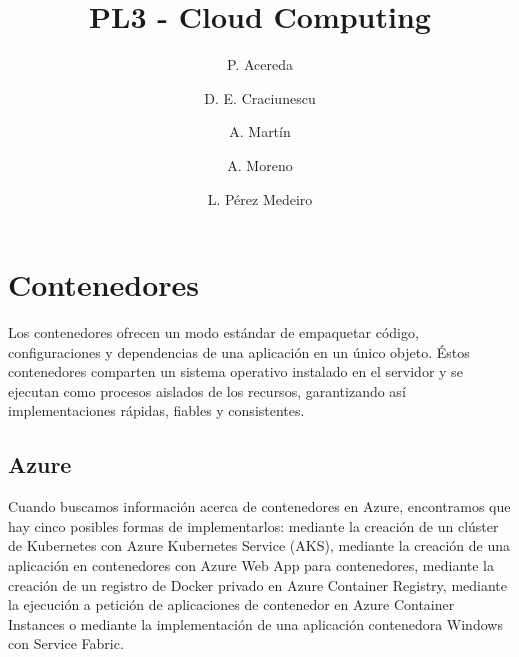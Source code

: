 \documentclass[english,runningheads,a4paper]{llncs}[2018/03/10]
\begin{document}
\author{P. Acereda \and
D. E. Craciunescu \and
A. Martín \and
A. Moreno \and
L. Pérez Medeiro
}

\title{PL3 - Cloud Computing}


\maketitle

\section{Contenedores}

Los contenedores ofrecen un modo estándar de empaquetar código, configuraciones 
y dependencias de una aplicación en un único objeto. Éstos contenedores 
comparten un sistema operativo instalado en el servidor y se ejecutan como 
procesos aislados de los recursos, garantizando así implementaciones rápidas, 
fiables y consistentes.
\newpage

\subsection*{Azure}
Cuando buscamos información acerca de contenedores en Azure, encontramos que 
hay cinco posibles formas de implementarlos: mediante la creación de un clúster 
de Kubernetes con Azure Kubernetes Service (AKS), mediante la creación de una 
aplicación en contenedores con Azure Web App para contenedores, mediante la 
creación de un registro de Docker privado en Azure Container Registry, mediante 
la ejecución a petición de aplicaciones de contenedor en Azure Container 
Instances o mediante la implementación de una aplicación contenedora Windows con
Service Fabric.
\newpage
\end{document}

